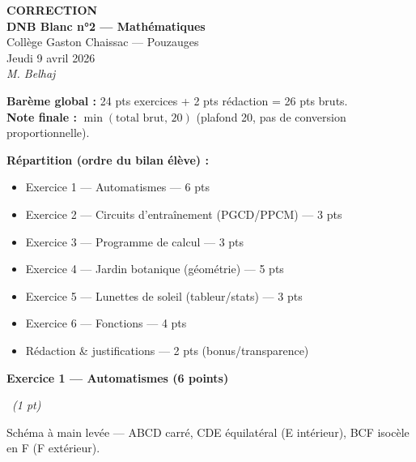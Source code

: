 \documentclass[a4paper,11pt]{article}
\newcommand{\exercice}[3]{%
  \vspace{0.4cm}%
  \noindent\colorbox{bleutitre!15}{%
    \parbox{\dimexpr\linewidth-2\fboxsep}{%
      \color{bleutitre}\Large\bfseries Exercice #1 — #2 \hfill \normalsize\normalfont(#3 points)%
    }%
  }%
  \par\vspace{0.4cm}%
}
\newcommand{\question}[2]{%
  \vspace{0.25cm}%
  \noindent{\bfseries\color{vertcorrection}Question #1}\ \textit{(#2 pt)}\par\vspace{0.15cm}%
}
\begin{document}
\thispagestyle{fancy}

\begin{center}
  {\LARGE\bfseries\color{bleutitre} CORRECTION}\\[0.4cm]
  {\Large\bfseries DNB Blanc n°2 — Mathématiques}\\[0.3cm]
  {\large Collège Gaston Chaissac — Pouzauges}\\[0.2cm]
  {\large Jeudi 9 avril 2026}\\[0.4cm]
  {\itshape M. Belhaj}
\end{center}

\vspace{0.6cm}

\begin{tcolorbox}[colback=gray!10, colframe=gray!50, arc=3pt, boxrule=0.5pt]
\textbf{Barème global :} 24 pts exercices + 2 pts rédaction = 26 pts bruts.\\
\textbf{Note finale :} $\min(\text{total brut},\,20)$ (plafond 20, pas de conversion proportionnelle).

\smallskip

\textbf{Répartition (ordre du bilan élève) :}
\begin{itemize}[leftmargin=1.2cm, itemsep=1pt, topsep=2pt]
  \item Exercice 1 — Automatismes — 6 pts
  \item Exercice 2 — Circuits d'entraînement (PGCD/PPCM) — 3 pts
  \item Exercice 3 — Programme de calcul — 3 pts
  \item Exercice 4 — Jardin botanique (géométrie) — 5 pts
  \item Exercice 5 — Lunettes de soleil (tableur/stats) — 3 pts
  \item Exercice 6 — Fonctions — 4 pts
  \item Rédaction \& justifications — 2 pts (bonus/transparence)
\end{itemize}
\end{tcolorbox}

\exercice{1}{Automatismes}{6}

\question{1}{1} Schéma à main levée — ABCD carré, CDE équilatéral (E intérieur), BCF isocèle en F (F extérieur).
\end{document}
